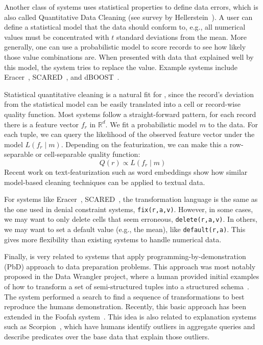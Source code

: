 Another class of systems uses statistical properties to define data errors, which is also called Quantitative Data Cleaning (see survey by Hellerstein~\cite{hellerstein2008quantitative}).
A user can define a statistical model that the data should conform to, e.g., all numerical values must be concentrated with $t$ standard deviations from the mean. 
More generally, one can use a probabilistic model to score records to see how likely those value combinations are.
When presented with data that explained well by this model, the system tries to replace the value.
Example systems include Eracer~\cite{eracer}, SCARED~\cite{yakout2013don}, and dBOOST~\cite{pit2016outlier}.

Statistical quantitative cleaning is a natural fit for \sys, since the record's deviation from the statistical model can be easily translated into a cell or record-wise quality function.  
Most systems follow a straight-forward pattern, for each record there is a feature vector $f_r$ in $\mathbb{R}^d$.
We fit a probabilistic model $m$ to the data.
For each tuple, we can query the likelihood of the observed feature vector under the model $L(f_r \mid m)$.
Depending on the featurization, we can make this a row-separable or cell-separable quality function:
\[
Q(r) \propto L(f_r \mid m)
\]
Recent work on text-featurization such as word embeddings show how similar model-based cleaning techniques can be applied to textual data.  

For systems like Eracer~\cite{eracer}, SCARED~\cite{yakout2013don}, the transformation language is the same as the one used in denial constraint systems, \texttt{fix(r,a,v)}.
However, in some cases, we may want to only delete cells that seem erroneous, \texttt{delete(r,a,v)}.
In others, we may want to set a default value (e.g., the mean), like \texttt{default(r,a)}.
This gives \sys more flexibility than existing systems to handle numerical data.

  
Finally, \sys is very related to systems that apply programming-by-demonstration (PbD) approach to data preparation problems.
This approach was most notably proposed in the Data Wrangler project, where a human provided initial examples of how to transform a set of semi-structured tuples into a structured schema~\cite{wrangler,trifacta}.
The system performed a search to find a sequence of transformations to best reproduce the humans demonstration.
Recently, this basic approach has been extended in the Foofah system~\cite{jin2017foofah}.
This idea is also related to explanation systems such as Scorpion~\cite{DBLP:journals/pvldb/0002M13}, which have humans identify outliers in aggregate queries and describe predicates over the base data that explain those outliers.


